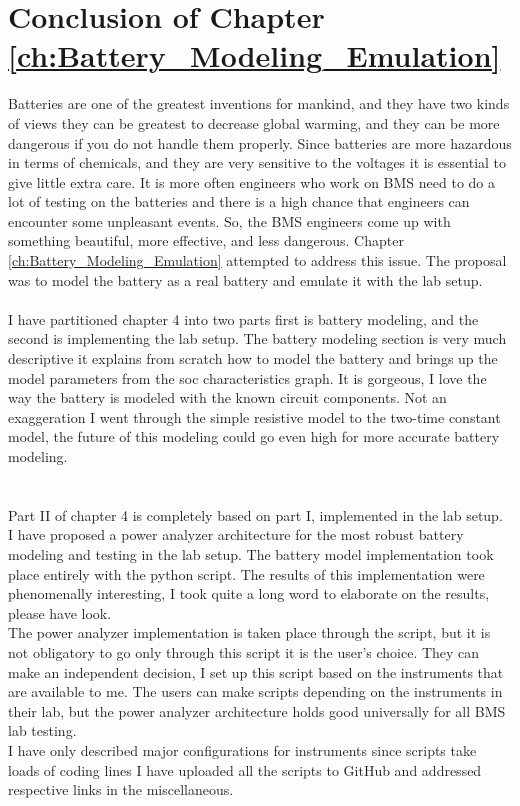 \section*{Conclusion of Chapter \ref{ch:Battery_Modeling_Emulation}}

Batteries are one of the greatest inventions for mankind, and they have two kinds of views they can be greatest to decrease global warming, and they can be more dangerous if you do not handle them properly. Since batteries are more hazardous in terms of chemicals, and they are very sensitive to the voltages it is essential to give little extra care. It is more often engineers who work on BMS need to do a lot of testing on the batteries and there is a high chance that engineers can encounter some unpleasant events. So, the BMS engineers come up with something beautiful, more effective, and less dangerous. Chapter \ref{ch:Battery_Modeling_Emulation} attempted to address this issue. The proposal was to model the battery as a real battery and emulate it with the lab setup.
\\\\
I have partitioned chapter 4 into two parts first is battery modeling, and the second is implementing the lab setup. The battery modeling section is very much descriptive it explains from scratch how to model the battery and brings up the model parameters from the soc characteristics graph. It is gorgeous, I love the way the battery is modeled with the known circuit components. Not an exaggeration I went through the simple resistive model to the two-time constant model, the future of this modeling could go even high for more accurate battery modeling.\\\\
\\
Part II of chapter 4 is completely based on part I, implemented in the lab setup. I have proposed a power analyzer architecture for the most robust battery modeling and testing in the lab setup. The battery model implementation took place entirely with the python script. The results of this implementation were phenomenally interesting, I took quite a long word to elaborate on the results, please have look.\\
The power analyzer implementation is taken place through the script, but it is not obligatory to go only through this script it is the user's choice. They can make an independent decision, I set up this script based on the instruments that are available to me. The users can make scripts depending on the instruments in their lab, but the power analyzer architecture holds good universally for all BMS lab testing.\\

I have only described major configurations for instruments since scripts take loads of coding lines I have uploaded all the scripts to GitHub and addressed respective links in the miscellaneous.

